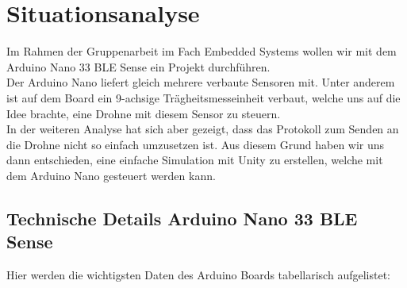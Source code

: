 \section{Situationsanalyse}

Im Rahmen der Gruppenarbeit im Fach Embedded Systems wollen wir mit dem Arduino Nano 33 BLE Sense ein Projekt durchführen.\\
Der Arduino Nano liefert gleich mehrere verbaute Sensoren mit. Unter anderem ist auf dem Board ein 9-achsige Trägheitsmesseinheit verbaut, welche uns auf die Idee brachte, eine Drohne mit diesem Sensor zu steuern.\\
In der weiteren Analyse hat sich aber gezeigt, dass das Protokoll zum Senden an die Drohne nicht so einfach umzusetzen ist. Aus diesem Grund haben wir uns dann entschieden, eine einfache Simulation mit Unity zu erstellen, welche mit dem Arduino Nano gesteuert werden kann.

\subsection{Technische Details Arduino Nano 33 BLE Sense}
Hier werden die wichtigsten Daten des Arduino Boards tabellarisch aufgelistet:

